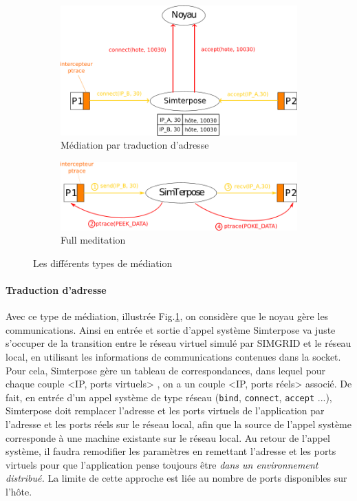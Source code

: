  \begin{figure}[H]
   \centering
   \begin{subfigure}{0.5\textwidth}
   \includegraphics[scale=0.5]{Pictures/png/Mediation_translation_v2}
   \caption{Médiation par traduction d'adresse}
   \label{ADDRESS_TRANSLATION}
   \end{subfigure}
   \begin{subfigure}{0.4\textwidth}
     \includegraphics[scale=0.5]{Pictures/png/Mediation_full_v2}
  \caption{Full meditation}
  \label{FULL_MEDIATION}
   \end{subfigure}
   \caption{Les différents types de médiation}
   \label{MEDIATION}
 \end{figure}

\paragraph{Traduction d'adresse}
 Avec ce type de médiation, illustrée Fig.\ref{ADDRESS_TRANSLATION}, on considère
 que le noyau gère les communications. Ainsi en entrée et sortie d'appel système
 Simterpose va juste s'occuper de la transition entre le réseau virtuel simulé
 par SIMGRID et le réseau local, en utilisant les informations de communications
 contenues dans la socket. Pour cela, Simterpose gère un tableau de
 correspondances, dans lequel pour chaque couple <IP, ports virtuels> , on a un
 couple <IP, ports réels> associé.  De fait, en entrée d'un appel système de
 type réseau (\texttt{bind}, \texttt{connect}, \texttt{accept} ...), Simterpose
 doit remplacer l'adresse et les ports virtuels de l'application par l'adresse
 et les ports réels sur le réseau local, afin que la source de l'appel système
 corresponde à une machine existante sur le réseau local. Au retour de l'appel
 système, il faudra remodifier les paramètres en remettant l'adresse et les
 ports virtuels pour que l'application pense toujours être \textit{dans un
   environnement distribué.}  La limite de cette approche est liée au nombre de
 ports disponibles sur l'hôte.

